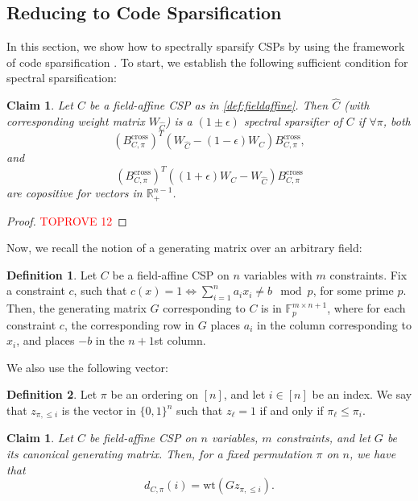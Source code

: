 \documentclass[11pt]{article}
\newtheorem{claim}[theorem]{Claim}
\theoremstyle{definition}
\newtheorem{definition}{Definition}[section]
\newcommand{\F}{\mathbb{F}}
\newcommand{\R}{\mathbb{R}}
\newcommand{\zo}{\{0, 1\}}
\newcommand{\eps}{\epsilon}
\newcommand{\wt}{\mathrm{wt}}
\begin{document}
\subsection{Reducing to Code Sparsification}

In this section, we show how to spectrally sparsify CSPs by using the framework of code sparsification \cite{KPS24, KPS24c}. To start, we establish the following sufficient condition for spectral sparsification:

\begin{claim}\label{clm:copositiveMatrixGeneral}
	Let $C$ be a field-affine CSP as in \cref{def:fieldaffine}. Then $\hat{C}$ (with corresponding weight matrix $W_{\hat{C}}$) is a $(1 \pm \eps)$ spectral sparsifier of $C$ if $\forall \pi$, both
	\[
	(B^{\text{cross}}_{C, \pi})^T (W_{\hat{C}} - (1 - \eps)W_C) B^{\text{cross}}_{C, \pi},
	\]
	and 
	\[
	(B^{\text{cross}}_{C, \pi})^T ((1 + \eps)W_C - W_{\hat{C}} ) B^{\text{cross}}_{C, \pi} 
	\]
	are copositive for vectors in $\R^{n-1}_+$.
\end{claim}

\begin{proof}\textcolor{red}{TOPROVE 12}\end{proof}

Now, we recall the notion of a generating matrix over an arbitrary field:

\begin{definition}\label{def:genMatrixfield}
    Let $C$ be a field-affine CSP on $n$ variables with $m$ constraints. Fix a constraint $c$, such that $c(x) =1 \iff \sum_{i = 1}^n a_i x_i \neq b \mod p$, for some prime $p$. Then, the generating matrix $G$ corresponding to $C$ is in $\F_p^{m \times {n+1}}$, where for each constraint $c$, the corresponding row in $G$ places $a_i$ in the column corresponding to $x_i$, and places $-b$ in the $n+1$st column.
\end{definition}

We also use the following vector:

\begin{definition}
	Let $\pi$ be an ordering on $[n]$, and let $i \in [n]$ be an index. We say that $z_{\pi, \leq i}$ is the vector in $\zo^n$ such that $z_{\ell} = 1$ if and only if $\pi_{\ell} \leq \pi_i$.
\end{definition}

\begin{claim}\label{clm:crossingEquivalenceGeneral}
	Let $C$ be field-affine CSP on $n$ variables, $m$ constraints, and let $G$ be its canonical generating matrix. Then, for a fixed permutation $\pi$ on $n$, we have that 
	\[
	d_{C, \pi}(i) = \wt(G z_{\pi, \leq i}).
	\]
\end{claim}
\end{document}
